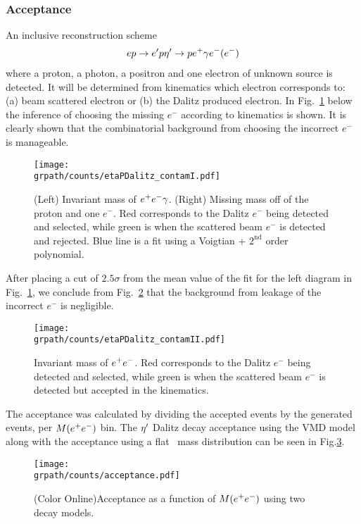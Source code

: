 \subsubsection{Acceptance}\label{sec.reconstruction}
An inclusive reconstruction scheme
\begin{align}
ep\to e'p \eta^{\prime} \rightarrow p e^+ \gamma e^- (e^-)
\end{align}
where a proton, a photon, a positron and one electron of unknown source is detected. It will be determined from kinematics which electron corresponds to: (a) beam scattered electron or (b) the Dalitz produced electron. In Fig.~\ref{fig:recon} below the inference of choosing the missing $e^-$ according to kinematics is shown. It is clearly shown that the combinatorial  background from choosing the incorrect $e^-$ is manageable.
\begin{figure}[h!]\begin{center}
		\texttt{[image: \\grpath/counts/etaPDalitz\_contamI.pdf]}
		\caption[Reconstrcution with FASTMC]{\label{fig:recon}{(Left) Invariant mass of $e^+e^- \gamma$. (Right) Missing mass off of the proton and one $e^-$.  Red corresponds to the Dalitz $e^-$ being detected and selected, while green is when the scattered beam $e^-$ is detected and rejected. Blue line is a fit using a Voigtian + $2^{\mathrm{nd}}$ order polynomial.}}
	\end{center}\end{figure}
	\FloatBarrier
After placing a cut of $2.5\sigma$ from the mean value of the fit for the left diagram in Fig.~\ref{fig:recon}, we conclude from Fig.~\ref{fig:recondalitz} that the background from leakage of the incorrect $e^-$ is negligible.
\begin{figure}[h!]\begin{center}
		\texttt{[image: \\grpath/counts/etaPDalitz\_contamII.pdf]}
		\caption[Reconstrcution with FASTMC]{\label{fig:recondalitz}{Invariant mass of $e^+e^-$.  Red corresponds to the Dalitz $e^-$ being detected and selected, while green is when the scattered beam $e^-$ is detected but accepted in the kinematics.}}
	\end{center}\end{figure}
	\FloatBarrier
The acceptance was calculated by dividing the accepted events by the generated events, per $M(\epem)$ bin. The $\eta^{\prime}$ Dalitz decay acceptance using the VMD model along with the acceptance using a flat \epemT \ mass distribution can be seen in Fig.\ref{fig:VMDaccepted}.
\begin{figure}[h!]\begin{center}
		\texttt{[image: \\grpath/counts/acceptance.pdf]}
		\caption[Acceptance as a function of $M(\epem)$]{\label{fig:VMDaccepted}{(Color Online)Acceptance as a function of $M(\epem)$ using two decay models.}}
	\end{center}\end{figure}
\FloatBarrier
